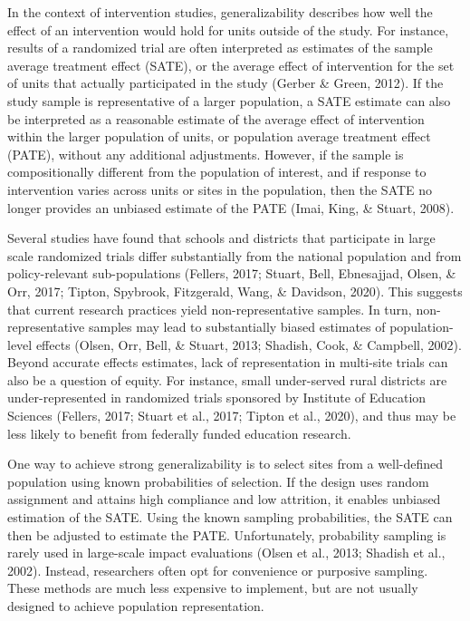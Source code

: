 \documentclass[
  man,floatsintext]{apa6}
\begin{document}
In the context of intervention studies, generalizability describes how well the effect of an intervention would hold for units outside of the study. For instance, results of a randomized trial are often interpreted as estimates of the sample average treatment effect (SATE), or the average effect of intervention for the set of units that actually participated in the study (Gerber \& Green, 2012). If the study sample is representative of a larger population, a SATE estimate can also be interpreted as a reasonable estimate of the average effect of intervention within the larger population of units, or population average treatment effect (PATE), without any additional adjustments. However, if the sample is compositionally different from the population of interest, and if response to intervention varies across units or sites in the population, then the SATE no longer provides an unbiased estimate of the PATE (Imai, King, \& Stuart, 2008).

Several studies have found that schools and districts that participate in large scale randomized trials differ substantially from the national population and from policy-relevant sub-populations (Fellers, 2017; Stuart, Bell, Ebnesajjad, Olsen, \& Orr, 2017; Tipton, Spybrook, Fitzgerald, Wang, \& Davidson, 2020). This suggests that current research practices yield non-representative samples. In turn, non-representative samples may lead to substantially biased estimates of population-level effects (Olsen, Orr, Bell, \& Stuart, 2013; Shadish, Cook, \& Campbell, 2002). Beyond accurate effects estimates, lack of representation in multi-site trials can also be a question of equity. For instance, small under-served rural districts are under-represented in randomized trials sponsored by Institute of Education Sciences (Fellers, 2017; Stuart et al., 2017; Tipton et al., 2020), and thus may be less likely to benefit from federally funded education research.

One way to achieve strong generalizability is to select sites from a well-defined population using known probabilities of selection. If the design uses random assignment and attains high compliance and low attrition, it enables unbiased estimation of the SATE. Using the known sampling probabilities, the SATE can then be adjusted to estimate the PATE. Unfortunately, probability sampling is rarely used in large-scale impact evaluations (Olsen et al., 2013; Shadish et al., 2002). Instead, researchers often opt for convenience or purposive sampling. These methods are much less expensive to implement, but are not usually designed to achieve population representation.
\end{document}
